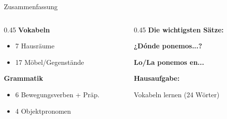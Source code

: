 \documentclass[aspectratio=169, 11pt]{beamer}
\newcommand{\seriftext}[1]{{\fontfamily{ppl}\selectfont #1}}
\newcommand{\es}[1]{\seriftext{\textbf{#1}}}
\begin{document}
\begin{frame}{Zusammenfassung}
    \vspace{0.3cm}

    \begin{columns}[T]
        \begin{column}{0.45\textwidth}
            \textbf{Vokabeln}

            \begin{itemize}
                \item 7 Hausräume
                \item 17 Möbel/Gegenstände
            \end{itemize}

            \vspace{0.3cm}

            \textbf{Grammatik}

            \begin{itemize}
                \item 6 Bewegungsverben + Präp.
                \item 4 Objektpronomen
            \end{itemize}
        \end{column}

        \begin{column}{0.45\textwidth}
            \textbf{Die wichtigsten Sätze:}

            \vspace{0.3cm}

            \es{¿Dónde ponemos...?}

            \vspace{0.2cm}

            \es{Lo/La ponemos en...}

            \vspace{0.5cm}

            \textbf{Hausaufgabe:}

            \vspace{0.3cm}

            Vokabeln lernen (24 Wörter)
        \end{column}
    \end{columns}
\end{frame}
\end{document}
